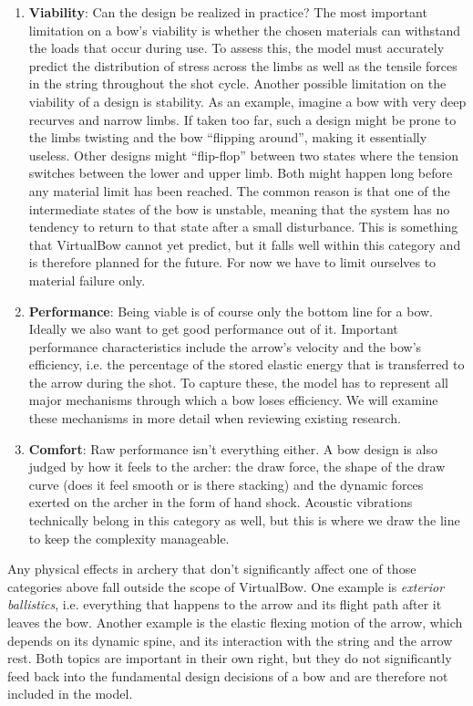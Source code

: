 \begin{enumerate}
\item \textbf{Viability}: Can the design be realized in practice?
The most important limitation on a bow's viability is whether the chosen materials can withstand the loads that occur during use.
To assess this, the model must accurately predict the distribution of stress across the limbs as well as the tensile forces in the string throughout the shot cycle.
Another possible limitation on the viability of a design is stability.
As an example, imagine a bow with very deep recurves and narrow limbs.
If taken too far, such a design might be prone to the limbs twisting and the bow ``flipping around'', making it essentially useless.
Other designs might ``flip-flop'' between two states where the tension switches between the lower and upper limb.
Both might happen long before any material limit has been reached.
The common reason is that one of the intermediate states of the bow is unstable, meaning that the system has no tendency to return to that state after a small disturbance.
This is something that VirtualBow cannot yet predict, but it falls well within this category and is therefore planned for the future.
For now we have to limit ourselves to material failure only.

\item \textbf{Performance}: Being viable is of course only the bottom line for a bow.
Ideally we also want to get good performance out of it.
Important performance characteristics include the arrow's velocity and the bow's efficiency, i.e. the percentage of the stored elastic energy that is transferred to the arrow during the shot.
To capture these, the model has to represent all major mechanisms through which a bow loses efficiency.
We will examine these mechanisms in more detail when reviewing existing research.

\item \textbf{Comfort}: Raw performance isn't everything either.
A bow design is also judged by how it feels to the archer: the draw force, the shape of the draw curve (does it feel smooth or is there stacking) and the dynamic forces exerted on the archer in the form of hand shock.
Acoustic vibrations technically belong in this category as well, but this is where we draw the line to keep the complexity manageable.
\end{enumerate}

Any physical effects in archery that don't significantly affect one of those categories above fall outside the scope of VirtualBow.
One example is \textit{exterior ballistics}, i.e. everything that happens to the arrow and its flight path after it leaves the bow.
Another example is the elastic flexing motion of the arrow, which depends on its dynamic spine, and its interaction with the string and the arrow rest.
Both topics are important in their own right, but they do not significantly feed back into the fundamental design decisions of a bow and are therefore not included in the model.

